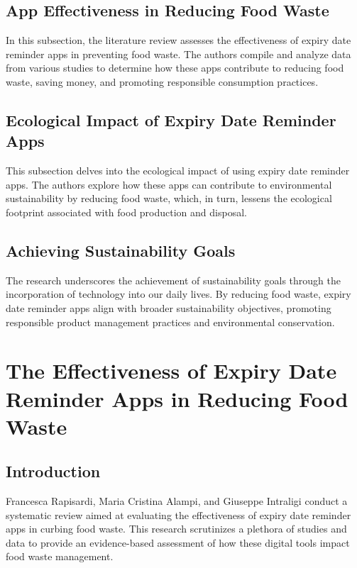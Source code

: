 \subsection{App Effectiveness in Reducing Food Waste}

In this subsection, the literature review assesses the effectiveness of expiry date reminder apps in preventing food waste. The authors compile and analyze data from various studies to determine how these apps contribute to reducing food waste, saving money, and promoting responsible consumption practices.

\subsection{Ecological Impact of Expiry Date Reminder Apps}

This subsection delves into the ecological impact of using expiry date reminder apps. The authors explore how these apps can contribute to environmental sustainability by reducing food waste, which, in turn, lessens the ecological footprint associated with food production and disposal.

\subsection{Achieving Sustainability Goals}

The research underscores the achievement of sustainability goals through the incorporation of technology into our daily lives. By reducing food waste, expiry date reminder apps align with broader sustainability objectives, promoting responsible product management practices and environmental conservation.

\section{The Effectiveness of Expiry Date Reminder Apps in Reducing Food Waste}

\subsection{Introduction}

Francesca Rapisardi, Maria Cristina Alampi, and Giuseppe Intraligi conduct a systematic review aimed at evaluating the effectiveness of expiry date reminder apps in curbing food waste. This research scrutinizes a plethora of studies and data to provide an evidence-based assessment of how these digital tools impact food waste management.


